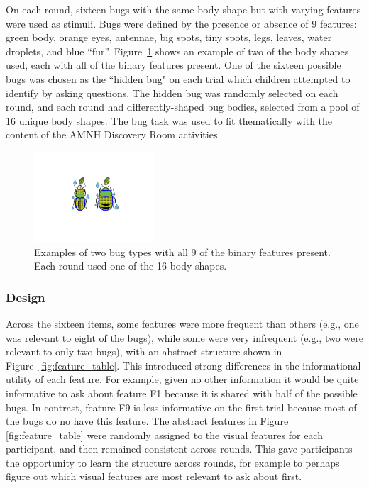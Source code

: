 \documentclass[man,floatsintext]{apa6}
\begin{document}
On each round, sixteen bugs with the same body shape but with varying features were used as stimuli. Bugs were defined by the presence or absence of 9 features: green body, 
orange eyes, antennae, big spots, tiny spots, legs, leaves, water droplets, and blue 
``fur''. Figure~\ref{fig:example_bugs} shows an example of two of the body shapes used, each with all of the binary features present. One of the sixteen possible bugs was chosen as the ``hidden bug" on each trial which 
children attempted to identify by asking questions. The hidden bug was 
randomly selected on each round, and each round had differently-shaped bug 
bodies, selected from a pool of 16 unique body shapes.  The bug task was used to fit thematically with the content of the AMNH Discovery Room activities.


\begin{figure}[h]
  \centering
  \includegraphics[width=0.4\textwidth]{figures/example_bugs}
  \caption{Examples of two bug types with all 9 of the binary features present. Each round used one of the 16 
body shapes. } %
  \label{fig:example_bugs}
\end{figure} 

\subsubsection{Design}

Across the sixteen items, some features were more frequent than others (e.g., one was relevant to eight of the  bugs), while some were very infrequent (e.g., two were relevant to only two bugs), with an
abstract structure shown in Figure~\ref{fig:feature_table}. This introduced
strong differences in the informational utility of each feature.  For example,
given no other information it would be quite informative to ask about feature F1
because it is shared with half of the possible bugs.  In contrast, feature
F9 is less informative on the first trial because most of the bugs do no have this
feature. The abstract features in Figure~
\ref{fig:feature_table} were randomly assigned to the visual features for each 
participant, and then remained consistent across rounds. This gave participants the 
opportunity to learn the structure across rounds, for example to perhaps figure out 
which visual features are most relevant to ask about first.
\end{document}
